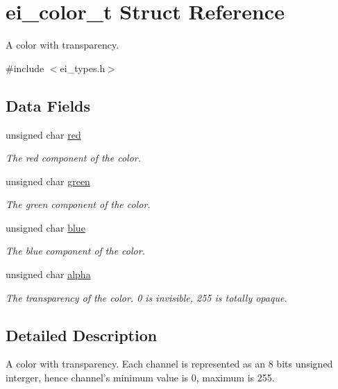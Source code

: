 \hypertarget{structei__color__t}{
\section{ei\_\-color\_\-t Struct Reference}
\label{structei__color__t}
}


A color with transparency.  


{\ttfamily \#include $<$ei\_\-types.h$>$}\subsection*{Data Fields}
\begin{DoxyCompactItemize}
\item 
unsigned char \hyperlink{structei__color__t_a9adf283c79176b3426ac63784f0bc17b}{red}
\begin{DoxyCompactList}\small\item\em The red component of the color. \item\end{DoxyCompactList}\item 
unsigned char \hyperlink{structei__color__t_ad85ce262fb9c76fe3c52b4eed19505d1}{green}
\begin{DoxyCompactList}\small\item\em The green component of the color. \item\end{DoxyCompactList}\item 
unsigned char \hyperlink{structei__color__t_af8d67b7a72cbb586519b55033350fb8c}{blue}
\begin{DoxyCompactList}\small\item\em The blue component of the color. \item\end{DoxyCompactList}\item 
unsigned char \hyperlink{structei__color__t_af213a14356db920b1a04f5270263ae61}{alpha}
\begin{DoxyCompactList}\small\item\em The transparency of the color. 0 is invisible, 255 is totally opaque. \item\end{DoxyCompactList}\end{DoxyCompactItemize}


\subsection{Detailed Description}
A color with transparency. Each channel is represented as an 8 bits unsigned interger, hence channel's minimum value is 0, maximum is 255. 

